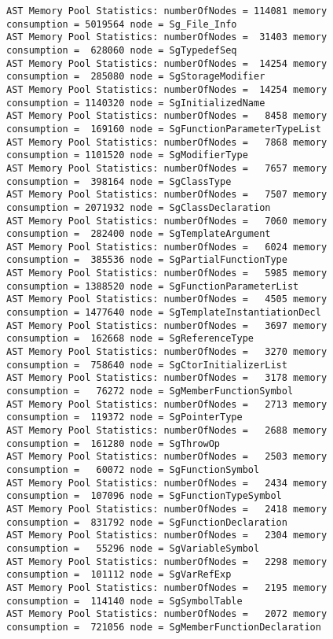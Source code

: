 \begin{figure}[!h]
{\mySmallFontSize
\begin{verbatim}
AST Memory Pool Statistics: numberOfNodes = 114081 memory consumption = 5019564 node = Sg_File_Info
AST Memory Pool Statistics: numberOfNodes =  31403 memory consumption =  628060 node = SgTypedefSeq
AST Memory Pool Statistics: numberOfNodes =  14254 memory consumption =  285080 node = SgStorageModifier
AST Memory Pool Statistics: numberOfNodes =  14254 memory consumption = 1140320 node = SgInitializedName
AST Memory Pool Statistics: numberOfNodes =   8458 memory consumption =  169160 node = SgFunctionParameterTypeList
AST Memory Pool Statistics: numberOfNodes =   7868 memory consumption = 1101520 node = SgModifierType
AST Memory Pool Statistics: numberOfNodes =   7657 memory consumption =  398164 node = SgClassType
AST Memory Pool Statistics: numberOfNodes =   7507 memory consumption = 2071932 node = SgClassDeclaration
AST Memory Pool Statistics: numberOfNodes =   7060 memory consumption =  282400 node = SgTemplateArgument
AST Memory Pool Statistics: numberOfNodes =   6024 memory consumption =  385536 node = SgPartialFunctionType
AST Memory Pool Statistics: numberOfNodes =   5985 memory consumption = 1388520 node = SgFunctionParameterList
AST Memory Pool Statistics: numberOfNodes =   4505 memory consumption = 1477640 node = SgTemplateInstantiationDecl
AST Memory Pool Statistics: numberOfNodes =   3697 memory consumption =  162668 node = SgReferenceType
AST Memory Pool Statistics: numberOfNodes =   3270 memory consumption =  758640 node = SgCtorInitializerList
AST Memory Pool Statistics: numberOfNodes =   3178 memory consumption =   76272 node = SgMemberFunctionSymbol
AST Memory Pool Statistics: numberOfNodes =   2713 memory consumption =  119372 node = SgPointerType
AST Memory Pool Statistics: numberOfNodes =   2688 memory consumption =  161280 node = SgThrowOp
AST Memory Pool Statistics: numberOfNodes =   2503 memory consumption =   60072 node = SgFunctionSymbol
AST Memory Pool Statistics: numberOfNodes =   2434 memory consumption =  107096 node = SgFunctionTypeSymbol
AST Memory Pool Statistics: numberOfNodes =   2418 memory consumption =  831792 node = SgFunctionDeclaration
AST Memory Pool Statistics: numberOfNodes =   2304 memory consumption =   55296 node = SgVariableSymbol
AST Memory Pool Statistics: numberOfNodes =   2298 memory consumption =  101112 node = SgVarRefExp
AST Memory Pool Statistics: numberOfNodes =   2195 memory consumption =  114140 node = SgSymbolTable
AST Memory Pool Statistics: numberOfNodes =   2072 memory consumption =  721056 node = SgMemberFunctionDeclaration

\end{verbatim}}
\end{figure}
